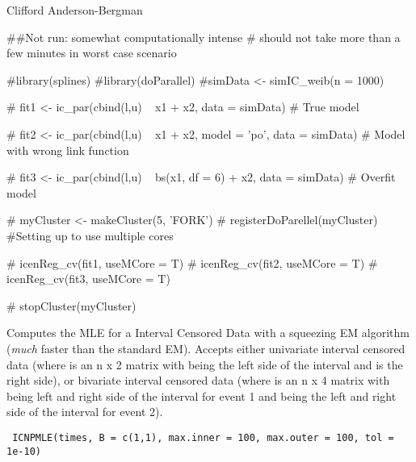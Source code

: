 \documentclass[a4paper]{book}
\begin{document}
%
\begin{Author}\relax
Clifford Anderson-Bergman
\end{Author}
%
\begin{Examples}
\begin{ExampleCode}
  ##Not run: somewhat computationally intense
  # should not take more than a few minutes in worst case scenario
  
  #library(splines)
  #library(doParallel)
  #simData <- simIC_weib(n = 1000)
  
  # fit1 <- ic_par(cbind(l,u) ~ x1 + x2, data = simData)  
       # True model
  
  # fit2 <- ic_par(cbind(l,u) ~ x1 + x2, model = 'po', data = simData) 
       # Model with wrong link function
  
  # fit3 <- ic_par(cbind(l,u) ~ bs(x1, df = 6) + x2, data = simData)  
       # Overfit model
  
  # myCluster <- makeCluster(5, 'FORK')
  # registerDoParellel(myCluster)
        #Setting up to use multiple cores
  
  # icenReg_cv(fit1, useMCore = T)
  # icenReg_cv(fit2, useMCore = T)
  # icenReg_cv(fit3, useMCore = T)
  
  # stopCluster(myCluster)
\end{ExampleCode}
\end{Examples}
%
\begin{Description}\relax
Computes the MLE for a Interval Censored Data with a squeezing EM algorithm (\emph{much} faster than the standard EM). Accepts either univariate interval censored data (where  is an n x 2 matrix with  being the left side of the interval and  is the right side), or bivariate interval censored data (where  is an n x 4 matrix with  being left and right side of the interval for event 1 and  being the left and right side of the interval for event 2).
\end{Description}
%
\begin{Usage}
\begin{verbatim}
 ICNPMLE(times, B = c(1,1), max.inner = 100, max.outer = 100, tol = 1e-10)
\end{verbatim}
\end{Usage}
%
\end{document}
